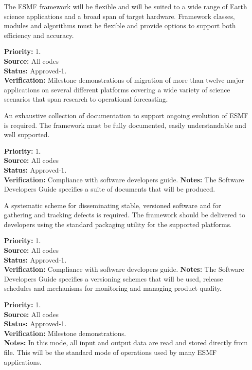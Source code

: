  The ESMF framework will be flexible and will
be suited to a wide range of Earth science applications and a broad span
of target hardware. Framework classes, modules and algorithms must be flexible and
provide options to support both efficiency and accuracy.
\begin{reqlist}
{\bf Priority:} 1. \\
{\bf Source:} All codes\\
{\bf Status:} Approved-1. \\
{\bf Verification:} Milestone demonstrations of migration
of more than twelve major applications on several different
platforms covering a wide variety of science scenarios
that span research to operational forecasting.
\end{reqlist}

 An exhaustive collection of documentation
to support ongoing evolution of ESMF is required. The framework must be 
fully documented, easily understandable and well supported.
\begin{reqlist}
{\bf Priority:} 1. \\
{\bf Source:} All codes\\
{\bf Status:} Approved-1. \\
{\bf Verification:} Compliance with software developers guide.
{\bf Notes:} The Software Developers Guide specifies a suite of documents 
that will be produced.
\end{reqlist}

 A systematic scheme for disseminating
stable, versioned software and for gathering and tracking defects is required.
The framework should be delivered to developers using the standard packaging
utility for the supported platforms.
\begin{reqlist}
{\bf Priority:} 1. \\
{\bf Source:} All codes\\
{\bf Status:} Approved-1. \\
{\bf Verification:} Compliance with software developers guide.
{\bf Notes:} The Software Developers Guide specifies a versioning
schemes that will be used, release schedules and mechanisms for monitoring
and managing product quality.
\end{reqlist}

\begin{reqlist}
{\bf Priority:} 1. \\
{\bf Source:} All codes\\
{\bf Status:} Approved-1. \\
{\bf Verification:} Milestone demonstrations.\\
{\bf Notes:} In this mode, all input and output data are read and stored
directly from file. This will be the standard mode of operations used by
many ESMF applications.
\end{reqlist}

